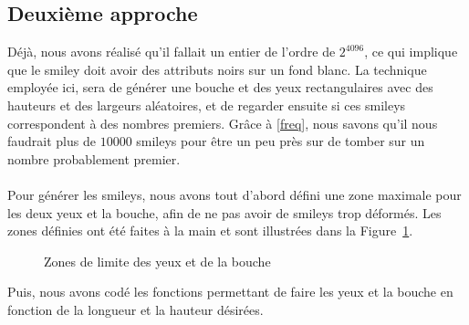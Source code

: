 \documentclass{article}
\begin{document}
\subsection{Deuxième approche}

Déjà, nous avons réalisé qu'il fallait un entier de l'ordre de $2^{4096}$, ce qui implique que le smiley doit avoir des attributs noirs sur un fond blanc. La technique employée ici, sera de générer une bouche et des yeux rectangulaires avec des hauteurs et des largeurs aléatoires, et de regarder ensuite si ces smileys correspondent à des nombres premiers. Grâce à \eqref{freq}, nous savons qu'il nous faudrait plus de $10000$ smileys pour être un peu près sur de tomber sur un nombre probablement premier.\\ \\
Pour générer les smileys, nous avons tout d'abord défini une zone maximale pour les deux yeux et la bouche, afin de ne pas avoir de smileys trop déformés. Les zones définies ont été faites à la main et sont illustrées dans la Figure~\ref{fig:votre_image}.

\begin{figure}[H]
    \centering
    \caption{Zones de limite des yeux et de la bouche}
    \label{fig:votre_image}
\end{figure}

Puis, nous avons codé les fonctions permettant de faire les yeux et la bouche en fonction de la longueur et la hauteur désirées. 
\end{document}
